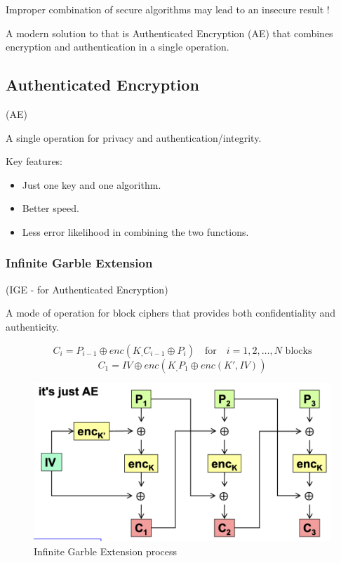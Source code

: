 \begin{tcolorbox}[colback=red!10!white, colframe=red!70!black, coltitle=white, title=Beware]
    Improper combination of secure algorithms may lead to an insecure result !
\end{tcolorbox}
A modern solution to that is Authenticated Encryption (AE) that combines encryption and authentication in a single operation.

\subsection{Authenticated Encryption}
\begin{center}
    (AE)
\end{center}
A single operation for privacy and authentication/integrity.

Key features:
\begin{itemize}
    \item Just one key and one algorithm.
    \item Better speed.
    \item Less error likelihood in combining the two functions.
\end{itemize}

\subsubsection{Infinite Garble Extension}
\begin{center}
    (IGE - for Authenticated Encryption)
\end{center}
A mode of operation for block ciphers that provides both confidentiality and authenticity.

\[
    C_i = P_{i-1} \oplus enc(K_, C_{i-1} \oplus P_i) \quad \text{for} \quad i=1,2,\dots,N \text{ blocks}
\]
\[
    C_1 = IV \oplus enc(K_, P_1 \oplus enc (K', IV))
\]

\begin{figure}[H]
    \centering
    \includegraphics[width=0.5\linewidth]{Images/Cryptography/AE.png}
    \caption{Infinite Garble Extension process}
\end{figure}

